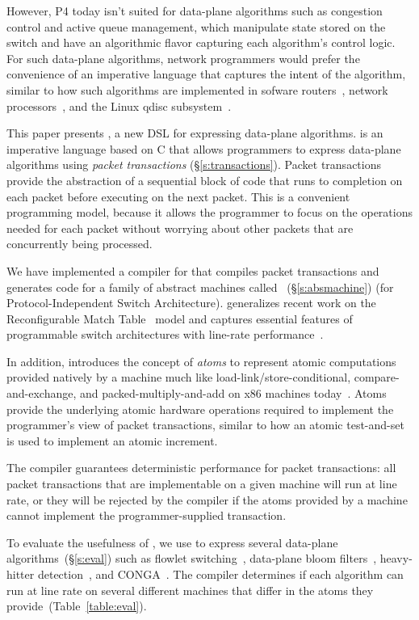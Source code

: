 However, P4 today isn't suited for data-plane algorithms such as congestion
control and active queue management, which manipulate state stored on the
switch and have an algorithmic flavor capturing each algorithm's control logic.
For such data-plane algorithms, network programmers would prefer the convenience
of an imperative language that captures the intent of the algorithm, similar to how
such algorithms are implemented in sofware routers~\cite{click}, network
processors~\cite{packetc, nova}, and the Linux qdisc subsystem~\cite{qdisc}.

This paper presents \pktlanguage, a new DSL for expressing data-plane
algorithms. \pktlanguage is an imperative language based on C that allows
programmers to express data-plane algorithms using {\em packet transactions}
(\S\ref{s:transactions}).  Packet transactions provide the abstraction of a
sequential block of code that runs to completion on each packet before
executing on the next packet. This is a convenient programming model, because it
allows the programmer to focus on the operations needed for each packet without
worrying about other packets that are concurrently being processed.

We have implemented a compiler for \pktlanguage that compiles \pktlanguage
packet transactions and generates code for a family of abstract machines called
\absmachine~(\S\ref{s:absmachine}) (for Protocol-Independent Switch
Architecture). \absmachine generalizes recent work on the Reconfigurable Match
Table~\cite{rmt} model and captures essential features of programmable switch
architectures with line-rate performance~\cite{rmt, xpliant, flexpipe}.

In addition, \absmachine introduces the concept of {\em atoms} to represent
atomic computations provided natively by a \absmachine machine much like
load-link/store-conditional, compare-and-exchange, and packed-multiply-and-add
on x86 machines today~\cite{x86_manual}.  Atoms provide the underlying atomic
hardware operations required to implement the programmer's view of packet
transactions, similar to how an atomic test-and-set is used to implement an
atomic increment.

The \pktlanguage compiler guarantees deterministic performance for packet
transactions: all packet transactions that are implementable on a given
\absmachine machine will run at line rate, or they will be rejected by the
compiler if the atoms provided by a \absmachine machine cannot implement the
programmer-supplied transaction.

To evaluate the usefulness of \pktlanguage, we use \pktlanguage to express
several data-plane algorithms~(\S\ref{s:eval}) such as flowlet
switching~\cite{flowlets}, data-plane bloom filters~\cite{bloom}, heavy-hitter
detection~\cite{opensketch}, and CONGA~\cite{conga}.  The \pktlanguage compiler
determines if each algorithm can run at line rate on several different
\absmachine machines that differ in the atoms they
provide~(Table~\ref{table:eval}).
